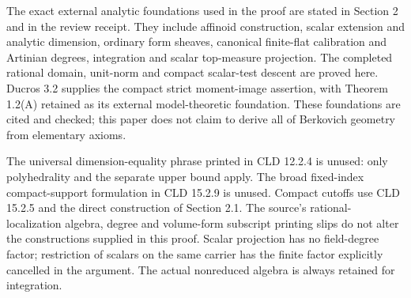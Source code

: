 \documentclass[
  11pt,
]{article}
\begin{document}
The exact external analytic foundations used in the proof are stated
in Section 2 and in the review receipt. They include affinoid
construction, scalar extension and analytic dimension, ordinary form
sheaves, canonical finite-flat calibration and Artinian degrees,
integration and scalar top-measure projection. The completed rational
domain, unit-norm and compact scalar-test descent are proved here.
Ducros 3.2 supplies the compact strict moment-image assertion, with
Theorem 1.2(A) retained as its external model-theoretic foundation.
These foundations are cited and checked; this paper does not claim to
derive all of Berkovich geometry from elementary axioms.

The universal dimension-equality phrase printed in CLD 12.2.4 is unused:
only polyhedrality and the separate upper bound apply. The broad
fixed-index compact-support formulation in CLD 15.2.9 is unused.
Compact cutoffs use CLD 15.2.5 and the direct construction of Section 2.1.
The source's rational-localization algebra, degree and volume-form
subscript printing slips do not alter the constructions supplied in
this proof. Scalar projection has no field-degree factor; restriction
of scalars on the same carrier has the finite factor explicitly
cancelled in the argument. The actual nonreduced algebra is always
retained for integration.
\end{document}
